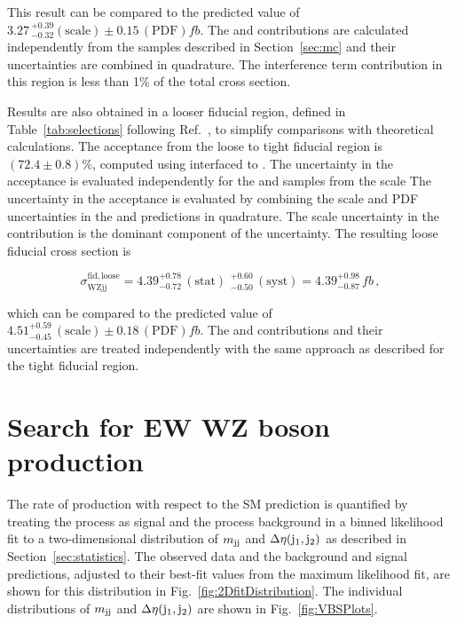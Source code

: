 This result can be compared to the predicted value of
$3.27 \, ^{+0.39}_{-0.32} \mathrm{(scale)} \pm 0.15\, \mathrm{(PDF)} \unit{fb}$.
The \EWWZ and \QCDWZ contributions are
calculated independently from the samples described in Section~\ref{sec:mc}
and their uncertainties are combined in quadrature. 
The interference term contribution in this region is less than 1\% of
the total cross section.

Results are also obtained in a looser fiducial region, defined in Table~\ref{tab:selections}
following Ref.~\cite{leshouches2017},
to simplify comparisons with theoretical calculations.
The acceptance from the loose to tight fiducial region
is $(72.4 \pm 0.8)\%$,
computed using \MG interfaced to \PYTHIA. 
The uncertainty in the acceptance is evaluated independently 
for the \EWWZ and \QCDWZ samples
from the scale
The uncertainty in the acceptance is evaluated 
by combining the scale and PDF uncertainties 
in the \EWWZ and \QCDWZ predictions in quadrature.
The scale uncertainty in the \QCDWZ contribution is the 
dominant component of the uncertainty.
The resulting \WZjj loose fiducial cross section is

\begin{equation}
  \sigma^{\mathrm{fid, loose}}_{\mathrm{WZjj}} = 
        4.39^{+0.78}_{-0.72} \, \mathrm{(stat)} \,\, ^{+0.60}_{-0.50} \, \mathrm{(syst)}
        = 4.39^{+0.98}_{-0.87} \,\unit{fb} \,,
\end{equation}

which can be compared to the predicted value of 
$4.51^{+0.59}_{-0.45} \, \mathrm{(scale)} \pm 0.18 \, \mathrm{(PDF)} \unit{fb}$.
The \EWWZ and \QCDWZ contributions 
and their uncertainties are treated independently with the same approach as described
for the tight fiducial region.

\section{Search for EW WZ boson production}

The rate of \EWWZ production with respect to the SM prediction
is quantified by treating the \EWWZ process as signal and the \QCDWZ
process background in a binned likelihood fit to a two-dimensional
distribution of $m_{\mathrm{jj}}$ and $\Delta\eta(\mathrm{j}_{1}, \mathrm{j}_{2})$ as described in Section~\ref{sec:statistics}.
The observed data and the background and signal predictions,
adjusted to their best-fit values from the maximum likelihood fit,
are shown for this distribution in Fig.~\ref{fig:2DfitDistribution}.
The individual distributions of $m_{\mathrm{jj}}$ and $\Delta\eta(\mathrm{j}_{1}, \mathrm{j}_{2})$ are shown in
Fig.~\ref{fig:VBSPlots}.

